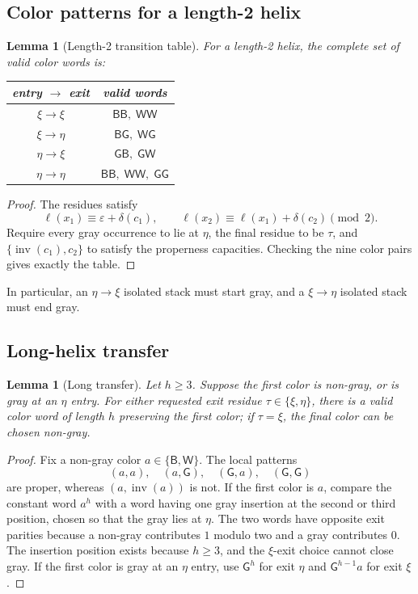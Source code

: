 \documentclass[11pt]{article}
\newtheorem{lemma}[theorem]{Lemma}
\newcommand{\Bcol}{\mathsf{B}}
\newcommand{\Wcol}{\mathsf{W}}
\newcommand{\Gray}{\mathsf{G}}
\newcommand{\inv}{\operatorname{inv}}
\newcommand{\level}{\ell}
\begin{document}
\subsection{Color patterns for a length-2 helix}

\begin{lemma}[Length-2 transition table]
\label{lem:two-pair}
For a length-2 helix, the complete set of valid color words is:
\begin{center}
\begin{tabular}{cc}
\toprule
entry $\to$ exit & valid words \\
\midrule
$\xi\to\xi$ & $\Bcol\Bcol,\;\Wcol\Wcol$ \\
$\xi\to\eta$ & $\Bcol\Gray,\;\Wcol\Gray$ \\
$\eta\to\xi$ & $\Gray\Bcol,\;\Gray\Wcol$ \\
$\eta\to\eta$ & $\Bcol\Bcol,\;\Wcol\Wcol,\;\Gray\Gray$ \\
\bottomrule
\end{tabular}
\end{center}
\end{lemma}

\begin{proof}
The residues satisfy
\[
\level(x_1)\equiv\varepsilon+\delta(c_1),
\qquad
\level(x_2)\equiv\level(x_1)+\delta(c_2)\pmod 2.
\]
Require every gray occurrence to lie at $\eta$, the final residue to be $\tau$, and $\{\inv(c_1),c_2\}$ to satisfy the properness capacities.  Checking the nine color pairs gives exactly the table.
\end{proof}

In particular, an $\eta\to\xi$ isolated stack must start gray, and a $\xi\to\eta$ isolated stack must end gray.

\subsection{Long-helix transfer}

\begin{lemma}[Long transfer]
\label{lem:long-transfer}
Let $h\ge3$.  Suppose the first color is non-gray, or is gray at an $\eta$ entry.  For either requested exit residue $\tau\in\{\xi,\eta\}$, there is a valid color word of length $h$ preserving the first color; if $\tau=\xi$, the final color can be chosen non-gray.
\end{lemma}

\begin{proof}
Fix a non-gray color $a\in\{\Bcol,\Wcol\}$.  The local patterns
\[
(a,a),\quad(a,\Gray),\quad(\Gray,a),\quad(\Gray,\Gray)
\]
are proper, whereas $(a,\inv(a))$ is not.  If the first color is $a$, compare the constant word $a^h$ with a word having one gray insertion at the second or third position, chosen so that the gray lies at $\eta$.  The two words have opposite exit parities because a non-gray contributes $1$ modulo two and a gray contributes $0$.  The insertion position exists because $h\ge3$, and the $\xi$-exit choice cannot close gray.  If the first color is gray at an $\eta$ entry, use $\Gray^h$ for exit $\eta$ and $\Gray^{h-1}a$ for exit $\xi$.
\end{proof}
\end{document}
